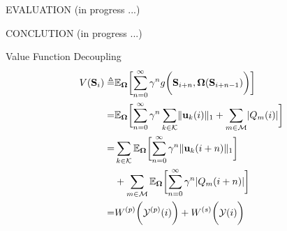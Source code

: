 \documentclass[10pt, conference, letterpaper]{IEEEtran}
\newcommand{\define}{\triangleq}
\renewcommand{\vec}{\mathbf}
\DeclarePairedDelimiter{\norm}{|}{|}
\DeclarePairedDelimiter{\Inorm}{\|}{\|_1}
\DeclarePairedDelimiter{\Paren}{\bigg(}{\bigg)}
\DeclarePairedDelimiter{\Bracket}{\bigg[}{\bigg]}
\newcommand{\apSet}{\mathcal{K}}
\newcommand{\esSet}{\mathcal{M}}
\newcommand{\Stat}{\mathbf{S}}
\newcommand{\Obsv}{\mathcal{Y}}
\newcommand{\Policy}{\mathbf{\Omega}}
\begin{document}
    \begin{section}{EVALUATION}
        \label{sec:evaluation}
        (in progress ...)
    \end{section}

    \begin{section}{CONCLUTION}
        \label{sec:conclusion}
        (in progress ...)
    \end{section}
    
    \appendices

    \begin{section}{Value Function Decoupling}
        \label{value-decouple}
        \begin{align*}
            V(\Stat_i) \define& \mathbb{E}_{\Policy} \Bracket{\sum_{n=0}^{\infty} \gamma^{n} g\Paren{\Stat_{i+n},\Policy(\Stat_{i+n-1})}}
            \nonumber\\
            =& \mathbb{E}_{\Policy} \Bracket{\sum_{n=0}^{\infty} \gamma^{n} \sum_{k\in\apSet} \Inorm{\vec{u}_{k}(i)} + \sum_{m\in\esSet} \norm{Q_m(i)}}
            \nonumber\\
            =& \sum_{k\in\apSet} \mathbb{E}_{\Policy}\Bracket{\sum_{n=0}^{\infty} \gamma^{n} \Inorm{\vec{u}_k(i+n)}} 
                \nonumber\\
                &+\sum_{m\in\esSet} \mathbb{E}_{\Policy}\Bracket{\sum_{n=0}^{\infty} \gamma^{n} |Q_m(i+n)|}
            \nonumber\\
            =& W^{(p)}\Paren{\Obsv^{(p)}(i)} + W^{(s)}\Paren{\Obsv(i)}
        \end{align*}
    \end{section}
\end{document}
